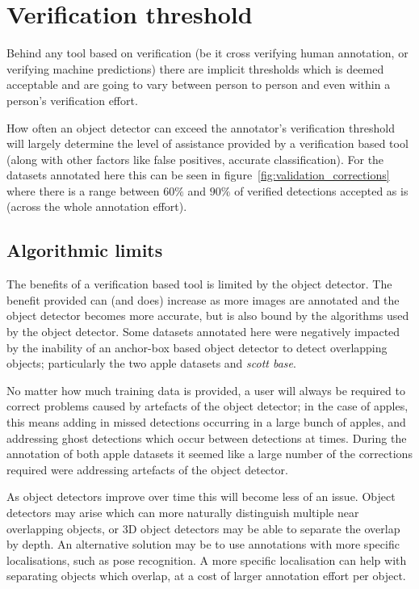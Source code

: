 \section{Verification threshold}
\label{sec:verification_threshold}

Behind any tool based on verification (be it cross verifying human annotation, or verifying machine predictions) there are implicit thresholds which is deemed acceptable and are going to vary between person to person and even within a person's verification effort. 

How often an object detector can exceed the annotator's verification threshold will largely determine the level of assistance provided by a verification based tool (along with other factors like false positives, accurate classification). For the datasets annotated here this can be seen in figure~\ref{fig:validation_corrections} where there is a range between $60\%$ and $90\%$ of verified detections accepted as is (across the whole annotation effort). 

\subsection{Algorithmic limits}
\label{sec:machine_limits}

The benefits of a verification based tool is limited by the object detector. The benefit provided can (and does) increase as more images are annotated and the object detector becomes more accurate, but is also bound by the algorithms used by the object detector. Some datasets annotated here were negatively impacted by the inability of an anchor-box based object detector to detect overlapping objects; particularly the two apple datasets and \emph{scott base}. 

No matter how much training data is provided, a user will always be required to correct problems caused by artefacts of the object detector; in the case of apples, this means adding in missed detections occurring in a large bunch of apples, and addressing ghost detections which occur between detections at times. During the annotation of both apple datasets it seemed like a large number of the corrections required were addressing artefacts of the object detector.

As object detectors improve over time this will become less of an issue. Object detectors may arise which can more naturally distinguish multiple near overlapping objects, or 3D object detectors may be able to separate the overlap by depth. An alternative solution may be to use annotations with more specific localisations, such as pose recognition. A more specific localisation can help with separating objects which overlap, at a cost of larger annotation effort per object.


